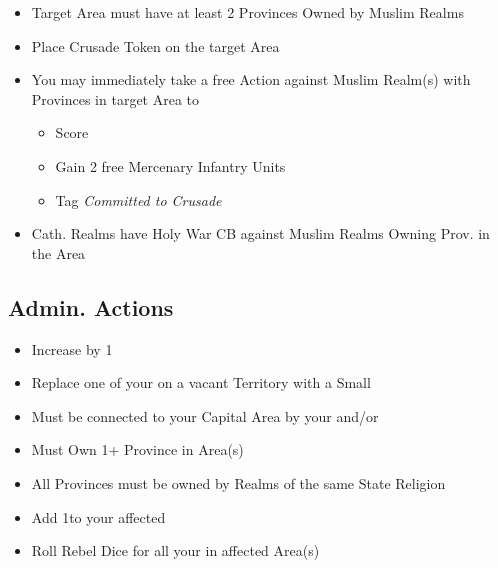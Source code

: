 \documentclass[10pt]{article}
\begin{document}
\begin{itemize}
	\item Target Area must have at least 2 Provinces Owned by Muslim Realms
	\item Place Crusade Token on the target Area
	\item You may immediately take a free  Action against Muslim Realm(s) with Provinces in target Area to
	\begin{itemize}
		\item Score 
		\item Gain 2 free Mercenary Infantry Units
		\item Tag \emph{Committed to Crusade}
	\end{itemize}
	\item Cath. Realms have Holy War CB against Muslim Realms Owning Prov. in the Area	
\end{itemize}

\subsection*{Admin. Actions}
\begin{itemize}
	\item Increase \stability by 1
\end{itemize}

\begin{itemize}
	\item Replace one of your \claims on a vacant Territory with a Small \town
	\item Must be connected to your Capital Area by your \towns and/or \ships
\end{itemize}

\begin{itemize}
	\item Must Own 1+ Province in Area(s)
	\item All Provinces must be owned by Realms of the same State Religion
	\item Add 1\unrest to your affected \towns
	\item Roll Rebel Dice for all your \unrest in affected Area(s)
\end{itemize}
\end{document}
